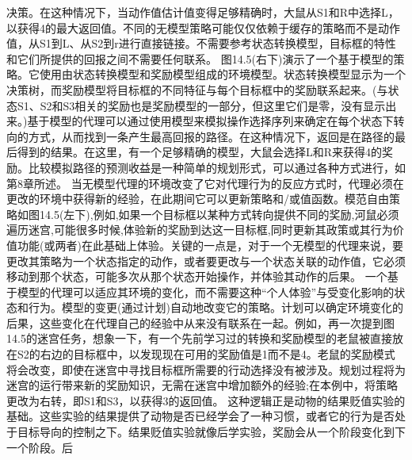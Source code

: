 决策。在这种情况下，当动作值估计值变得足够精确时，大鼠从S1和R中选择L，以获得4的最大返回值。不同的无模型策略可能仅仅依赖于缓存的策略而不是动作值，从S1到L、从S2到r进行直接链接。不需要参考状态转换模型，目标框的特性和它们所提供的回报之间不需要任何联系。
图14.5(右下)演示了一个基于模型的策略。它使用由状态转换模型和奖励模型组成的环境模型。状态转换模型显示为一个决策树，而奖励模型将目标框的不同特征与每个目标框中的奖励联系起来。(与状态S1、S2和S3相关的奖励也是奖励模型的一部分，但这里它们是零，没有显示出来。)基于模型的代理可以通过使用模型来模拟操作选择序列来确定在每个状态下转向的方式，从而找到一条产生最高回报的路径。在这种情况下，返回是在路径的最后得到的结果。在这里，有一个足够精确的模型，大鼠会选择L和R来获得4的奖励。比较模拟路径的预测收益是一种简单的规划形式，可以通过各种方式进行，如第8章所述。
当无模型代理的环境改变了它对代理行为的反应方式时，代理必须在更改的环境中获得新的经验，在此期间它可以更新策略和/或值函数。模范自由策略如图14.5(左下),例如,如果一个目标框以某种方式转向提供不同的奖励,河鼠必须遍历迷宫,可能很多时候,体验新的奖励到达这一目标框,同时更新其政策或其行为价值功能(或两者)在此基础上体验。关键的一点是，对于一个无模型的代理来说，要更改其策略为一个状态指定的动作，或者要更改与一个状态关联的动作值，它必须移动到那个状态，可能多次从那个状态开始操作，并体验其动作的后果。
一个基于模型的代理可以适应其环境的变化，而不需要这种“个人体验”与受变化影响的状态和行为。模型的变更(通过计划)自动地改变它的策略。计划可以确定环境变化的后果，这些变化在代理自己的经验中从来没有联系在一起。例如，再一次提到图14.5的迷宫任务，想象一下，有一个先前学习过的转换和奖励模型的老鼠被直接放在S2的右边的目标框中，以发现现在可用的奖励值是1而不是4。老鼠的奖励模式将会改变，即使在迷宫中寻找目标框所需要的行动选择没有被涉及。规划过程将为迷宫的运行带来新的奖励知识，无需在迷宫中增加额外的经验;在本例中，将策略更改为右转，即S1和S3，以获得3的返回值。
这种逻辑正是动物的结果贬值实验的基础。这些实验的结果提供了动物是否已经学会了一种习惯，或者它的行为是否处于目标导向的控制之下。结果贬值实验就像后学实验，奖励会从一个阶段变化到下一个阶段。后

